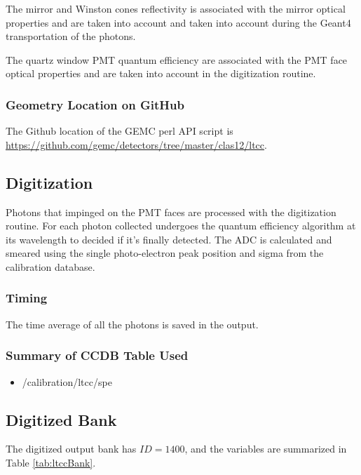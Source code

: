 The mirror and Winston cones reflectivity is associated with the mirror optical properties and are taken into
account and taken into account during the Geant4 transportation of the photons.

The quartz window PMT quantum efficiency are associated with the PMT face optical properties and are taken into account in
the digitization routine.

\subsubsection{Geometry Location on GitHub}
The Github location of the GEMC perl API script is  \url{https://github.com/gemc/detectors/tree/master/clas12/ltcc}.


\subsection{Digitization}

Photons that impinged on the PMT faces are processed with the digitization routine.
For each photon collected undergoes the quantum efficiency algorithm at its wavelength to decided if it's finally detected.
The ADC is calculated and smeared using the single photo-electron peak position and sigma from the calibration database.


\subsubsection{Timing}

The time average of all the photons is saved in the output.

\subsubsection{Summary of CCDB Table Used}

\begin{itemize}
	\item /calibration/ltcc/spe
\end{itemize}

\subsection{Digitized Bank}

The digitized output bank has $ID=1400$, and the variables are summarized in Table \ref{tab:ltccBank}.

